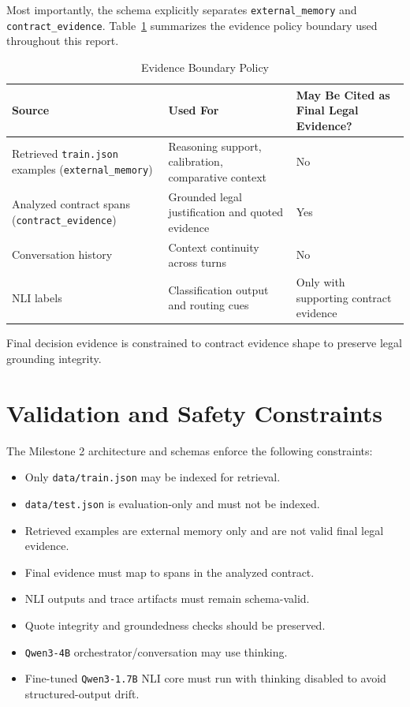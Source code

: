 \documentclass[11pt]{article}
\begin{document}
Most importantly, the schema explicitly separates \texttt{external\_memory} and \texttt{contract\_evidence}. Table~\ref{tab:evidence-boundary} summarizes the evidence policy boundary used throughout this report.

\begin{table}[htbp]
\centering
\caption{Evidence Boundary Policy}
\label{tab:evidence-boundary}
\small
\begin{tabularx}{\textwidth}{>{\raggedright\arraybackslash}p{3.2cm} >{\raggedright\arraybackslash}X >{\raggedright\arraybackslash}p{3.8cm}}
\toprule
\textbf{Source} & \textbf{Used For} & \textbf{May Be Cited as Final Legal Evidence?} \\
\midrule
Retrieved \texttt{train.json} examples (\texttt{external\_memory}) & Reasoning support, calibration, comparative context & No \\
Analyzed contract spans (\texttt{contract\_evidence}) & Grounded legal justification and quoted evidence & Yes \\
Conversation history & Context continuity across turns & No \\
NLI labels & Classification output and routing cues & Only with supporting contract evidence \\
\bottomrule
\end{tabularx}
\end{table}

Final decision evidence is constrained to contract evidence shape to preserve legal grounding integrity.

\section{Validation and Safety Constraints}
The Milestone 2 architecture and schemas enforce the following constraints:
\begin{itemize}
  \item Only \texttt{data/train.json} may be indexed for retrieval.
  \item \texttt{data/test.json} is evaluation-only and must not be indexed.
  \item Retrieved examples are external memory only and are not valid final legal evidence.
  \item Final evidence must map to spans in the analyzed contract.
  \item NLI outputs and trace artifacts must remain schema-valid.
  \item Quote integrity and groundedness checks should be preserved.
  \item \texttt{Qwen3-4B} orchestrator/conversation may use thinking.
  \item Fine-tuned \texttt{Qwen3-1.7B} NLI core must run with thinking disabled to avoid structured-output drift.
\end{itemize}
\end{document}
